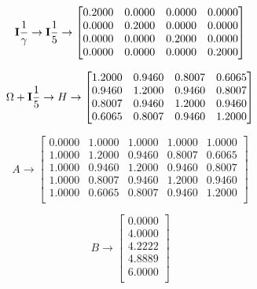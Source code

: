 \begin{equation}
        \vb{I}\frac{1}{\gamma}\to\vb{I}\frac{1}{5}\to
        \begin{bmatrix}
                0.2000 & 0.0000 & 0.0000 & 0.0000 \\
                0.0000 & 0.2000 & 0.0000 & 0.0000 \\
                0.0000 & 0.0000 & 0.2000 & 0.0000 \\
                0.0000 & 0.0000 & 0.0000 & 0.2000
        \end{bmatrix}
\end{equation}

\begin{equation}
        \Omega+\vb{I}\frac{1}{5}\to H\to \begin{bmatrix}
                1.2000 & 0.9460 & 0.8007 & 0.6065 \\
                0.9460 & 1.2000 & 0.9460 & 0.8007 \\
                0.8007 & 0.9460 & 1.2000 & 0.9460 \\
                0.6065 & 0.8007 & 0.9460 & 1.2000 \\
        \end{bmatrix}
\end{equation}

\begin{equation}
        A\to \begin{bmatrix}
                0.0000 & 1.0000 & 1.0000 & 1.0000 & 1.0000 \\
                1.0000 & 1.2000 & 0.9460 & 0.8007 & 0.6065 \\
                1.0000 & 0.9460 & 1.2000 & 0.9460 & 0.8007 \\
                1.0000 & 0.8007 & 0.9460 & 1.2000 & 0.9460 \\
                1.0000 & 0.6065 & 0.8007 & 0.9460 & 1.2000 \\
        \end{bmatrix}
\end{equation}

\begin{equation}
        B\to \begin{bmatrix}
                0.0000 \\
                4.0000 \\
                4.2222 \\
                4.8889 \\
                6.0000 \\
        \end{bmatrix}
\end{equation}

